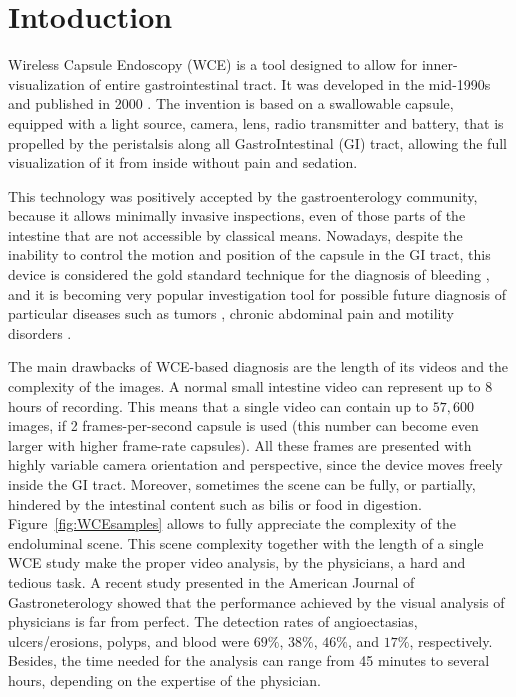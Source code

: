 \documentclass[review,12pt,3p]{elsarticle}
\begin{document}
\section{Intoduction}
\label{secIntro}

Wireless Capsule Endoscopy (WCE) is a tool designed to allow for inner-visualization of entire gastrointestinal tract. It was developed in the mid-1990s and published in 2000 \cite{iddan2000wireless}. %
The invention is based on a swallowable capsule, equipped with a light source, camera, lens, radio transmitter and battery, that is propelled by the peristalsis along all GastroIntestinal (GI) tract, allowing the full visualization of it from inside without pain and sedation.

This technology was positively accepted by the gastroenterology community, because it allows minimally invasive inspections, even of those parts of the intestine that are not accessible by classical means.
Nowadays, despite the inability to control the motion and position of the capsule in the GI tract, this device is considered the gold standard technique for the diagnosis of  bleeding \cite{eliakim2004wireless,mustafa2013small}, and it is becoming very popular investigation tool for  possible future diagnosis of particular diseases such as tumors \cite{tumor2006,tumor2010}, chronic abdominal pain \cite{YangPlosOne} and motility disorders \cite{malagelada2012functional}.

The main drawbacks of WCE-based diagnosis are the length of its videos and the complexity of the images. A normal small intestine video can represent up to 8 hours of recording. This means that a single video can contain up to $57,600$ images, if 2 frames-per-second capsule is used (this number can become even larger with higher frame-rate capsules). All these frames are presented with highly variable camera orientation and perspective, since the device moves freely inside the GI tract. Moreover, sometimes the scene can be fully, or partially, hindered by the intestinal content such as bilis or food in digestion. Figure~\ref{fig:WCEsamples} allows  to fully appreciate the complexity of the endoluminal scene.
This scene complexity together with the length of a single WCE study make the proper video analysis, by the physicians, a hard and tedious task. A recent study presented in the American Journal of Gastroneterology \cite{zheng2012detection} showed that the performance achieved by the visual analysis of physicians is far from perfect.
The detection rates of angioectasias, ulcers/erosions, polyps, and blood were $69\%$, $38\%$, $46\%$, and $17\%$, respectively. Besides, the time needed for the analysis can range from 45 minutes to several hours, depending on the expertise of the physician.
\end{document}
